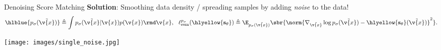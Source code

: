\begin{frame}{Denoising Score Matching \cite{vincent2011connection}}
 \textbf{Solution}: Smoothing data density / spreading samples by adding \textit{noise} to the data!
\begin{equation*}
    \hlblue{p_\sigma(\tilde{\v{x}})} \triangleq \int p_\sigma(\tilde{\v{x}} | \v{x}) p(\v{x}) \rmd \v{x}, \ \
    \ell_{\mathrm{esm}}^{p_\sigma}(\hlyellow{\mathbf{s}_\theta})  \triangleq \E_{p_\sigma(\tilde{\v{x}})}\sbr{\norm{\nabla_{\tilde{\v{x}}} \log p_\sigma(\tilde{\v{x}}) - \hlyellow{\mathbf{s}_\theta}(\tilde{\v{x}})}^2}.
\end{equation*}
\begin{center}
\texttt{[image: images/single\_noise.jpg]}    
\end{center}


\end{frame}

